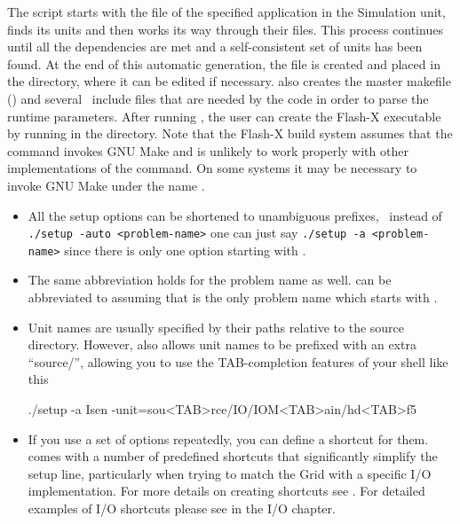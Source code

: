 The \setup script starts with the  file of the specified
application in the Simulation unit, finds its
 units and then works its way through their
 files. This process continues until all the dependencies
are met and a self-consistent set of units has been found. At the end
of this automatic generation,
the  file is created and placed in the 
directory, where it can be edited if necessary. \setup also creates
the master makefile () and several \FORTRAN\
include files that are needed by the code in order to parse the
runtime parameters. After running \setup, the user can create the
Flash-X executable by running \code{make} in the \code{object}
directory.
Note that the Flash-X build system assumes that the command  invokes GNU Make
and is unlikely to work properly with other implementations of the \code{make}
command. On some systems it may be necessary to invoke GNU Make under the name .


\begin{flashtip}
\begin{itemize}
\protect\item
All the setup options can be shortened to unambiguous prefixes,
\eg\ instead of \verb|./setup -auto <problem-name>| one can just say
\verb|./setup -a <problem-name>| since there is only one \setup
option starting with .

\protect\item
The same abbreviation holds for the problem name as well. 
can be abbreviated to \code{./setup -a Isen}
assuming that  is the only problem name which
starts with \code{Isen}.

\protect\item
Unit names are usually specified by their paths relative to the source
directory. However, \setup also allows unit names to be prefixed with an
extra ``source/'', allowing you to use the TAB-completion features of your
shell like this
\begin{codeseg}
./setup -a Isen -unit=sou<TAB>rce/IO/IOM<TAB>ain/hd<TAB>f5
\end{codeseg}

\protect\item
If you use a set of options repeatedly, you can define a shortcut for
them. \flashx comes with a number of predefined shortcuts that
significantly simplify the setup line, particularly when trying to
match the Grid with a specific I/O implementation. 
For more details on creating shortcuts see
.
For detailed examples of I/O shortcuts please see
in the I/O chapter.
\end{itemize}
\end{flashtip}


